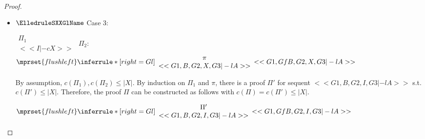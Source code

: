 \begin{proof}
\begin{enumerate}
\begin{itemize}
  \item $\ElledruleSXXGlName$ Case 3:
    \begin{center}
      \scriptsize
      \begin{math}
        \begin{array}{c}
          \Pi_1 \\
          {<<I |-c X>>}
        \end{array}
      \end{math}
      \qquad\qquad
      $\Pi_2$:
      \begin{math}
        $$\mprset{flushleft}
        \inferrule* [right={\tiny Gl}] {
          {
            \begin{array}{c}
              \pi \\
              {<<G1, B, G2, X, G3 |-l A>>}
            \end{array}
          }
        }{<<G1, Gf B, G2, X, G3 |-l A>>}
      \end{math}
    \end{center}
    By assumption, $c(\Pi_1),c(\Pi_2)\leq |X|$. By induction on $\Pi_1$ and $\pi$, there is a
    proof $\Pi'$ for sequent $<<G1, B, G2, I, G3 |-l A>>$ s.t. $c(\Pi') \leq |X|$. Therefore,
    the proof $\Pi$ can be constructed as follows with $c(\Pi) = c(\Pi') \leq |X|$.
    \begin{center}
      \scriptsize
      \begin{math}
        $$\mprset{flushleft}
        \inferrule* [right={\tiny Gl}] {
          {
            \begin{array}{c}
              \Pi' \\
              {<<G1, B, G2, I, G3 |-l A>>}
            \end{array}
          }
        }{<<G1, Gf B, G2, I, G3 |-l A>>}
      \end{math}
    \end{center}


\end{itemize}
\end{enumerate}
\end{proof}
